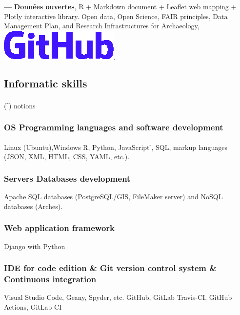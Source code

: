 \documentclass{article}
\begin{document}
\smallbreak
\textbf{--- }\textbf{Donn\'{e}es ouvertes}, \textsf{R} + \textsf{Markdown} document + \textsf{Leaflet} web mapping + \textsf{Plotly} interactive library. Open data, Open Science, FAIR principles, Data Management Plan, and Research Infrastructures for Archaeology, \href{https://zoometh.github.io/LOD}{\includegraphics[scale=0.12]{github-rect.png}}.

\subsection*{Informatic skills}
\begin{center}(\textbf{\textsuperscript{-}}) notions \end{center}
\smallbreak

\subsubsection*{OS {\textbar} Programming languages and software development}

Linux (Ubuntu),Windows \textbf{{\textbar}} \textsf{R}, \textsf{Python}, \textsf{JavaScript\textsuperscript{-}}, SQL, markup languages (JSON, XML, HTML, CSS, YAML, etc.).

\subsubsection*{Servers {\textbar} Databases development} 

Apache \textbf{{\textbar}} SQL databases (PostgreSQL/GIS, FileMaker server) and NoSQL databases (Arches).

\subsubsection*{Web application framework} 

\textsf{Django} with \textsf{Python}

\subsubsection*{IDE for code edition \& Git version control system \& Continuous integration} 

Visual Studio Code, Geany, Spyder, etc. \textbf{{\textbar}} GitHub, GitLab \textbf{{\textbar}} Travis-CI, GitHub Actions, GitLab CI
\end{document}
